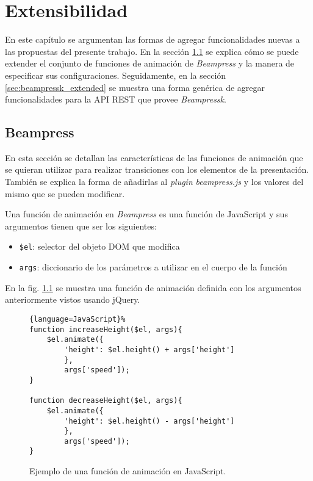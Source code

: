 \chapter{Extensibilidad} %
\label{cha:extensibilidad}
 	En este capítulo se argumentan las formas de agregar funcionalidades nuevas a las propuestas del presente trabajo. En la sección \ref{sec:beampress_extended} se explica cómo se puede extender el conjunto de funciones de animación de \textit{Beampress} y la manera de especificar sus configuraciones. Seguidamente, en la sección \ref{sec:beampressk_extended} se muestra una forma genérica de agregar funcionalidades para la API REST que provee \textit{Beampressk}.  

	\section{Beampress} %
	\label{sec:beampress_extended}
		En esta sección se detallan las características de las funciones de animación que se quieran utilizar para realizar transiciones con los elementos de la presentación. También se explica la forma de añadirlas al \textit{plugin} \textit{beampress.js} y los valores del mismo que se pueden modificar.

		Una función de animación en \textit{Beampress} es una función de JavaScript y sus argumentos tienen que ser los siguientes:

		\begin{itemize}
			\item \texttt{\$el}: selector del objeto DOM que modifica
			\item \texttt{args}: diccionario de los parámetros a utilizar en el cuerpo de la función
		\end{itemize}

		En la fig. \ref{fig:javascript_animation} se muestra una función de animación definida con los argumentos anteriormente vistos usando jQuery.

		\begin{figure}[htb]%
			\begin{lstlisting}{language=JavaScript}%
function increaseHeight($el, args){
    $el.animate({
    	'height': $el.height() + args['height'] 
    	}, 
    	args['speed']);
}

function decreaseHeight($el, args){
    $el.animate({
    	'height': $el.height() - args['height'] 
    	}, 
    	args['speed']);
}      
			\end{lstlisting}
		\caption{Ejemplo de una función de animación en JavaScript.} 
		\label{fig:javascript_animation} 
		\end{figure}		


